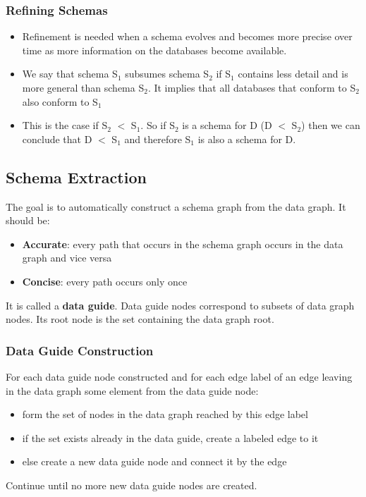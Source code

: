 \subsubsection{Refining Schemas}
\begin{itemize}
\item Refinement is needed when a schema evolves and becomes more precise over time as more information on the databases become available. 
\item We say that schema S$_{1}$ subsumes schema S$_{2}$ if S$_{1}$ contains less detail and is more general than schema S$_{2}$. It implies that all databases that conform to S$_{2}$ also conform to S$_{1}$
\item This is the case if S$_{2}$ $<$ S$_{1}$. So if S$_{2}$ is a schema for D (D $<$ S$_{2}$) then we can conclude that D $<$ S$_{1}$ and therefore S$_{1}$ is also a schema for D.
\end{itemize}

\subsection{Schema Extraction}
The goal is to automatically construct a schema graph from the data graph. It should be:
\begin{itemize}
\item \textbf{Accurate}: every path that occurs in the schema graph occurs in the data graph and vice versa
\item \textbf{Concise}: every path occurs only once
\end{itemize}
It is called a \textbf{data guide}. Data guide nodes correspond to subsets of data graph nodes. Its root node is the set containing the data graph root. 
\subsubsection{Data Guide Construction}
For each data guide node constructed and for each edge label of an  edge leaving in the data graph some element from the data guide node:
\begin{itemize}
\item form the set of nodes in the data graph reached by this edge label
\item if the set exists already in the data guide, create a labeled edge to it
\item else create a new data guide node and connect it by the edge
\end{itemize}
Continue until no more new data guide nodes are created.
\\
